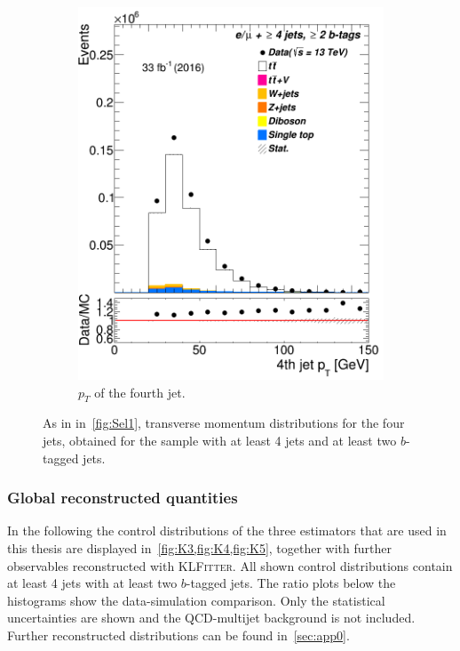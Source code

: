 \begin{figure} [t]
\begin{subfigure}{0.25\textwidth}
		\includegraphics[width=\linewidth]{ControlPlots_emujets_2016_4incl_2incl/jet3_pt_emujets_2016.png}
		\caption{$p_T$ of the fourth jet.} \label{fig:Sec28}
	\end{subfigure}
	
	
	\caption{As in in~\cref{fig:Sel1}, transverse momentum distributions  for the four jets, obtained for the sample with at least 4 jets and at least two $b$-tagged jets.}
	\label{fig:Sel4}
\end{figure}



\subsubsection{Global reconstructed quantities}


In the following the control distributions of the three estimators that are used in this thesis are displayed in~\cref{fig:K3,fig:K4,fig:K5}, together with further observables  reconstructed with \textsc{KLFitter}. 
All shown control distributions contain at least 4 jets with at least two $b$-tagged jets.  The ratio plots below the histograms show the data-simulation comparison. Only the statistical uncertainties are shown and the QCD-multijet background is not included. Further reconstructed distributions can be found in~\cref{sec:app0}. 

